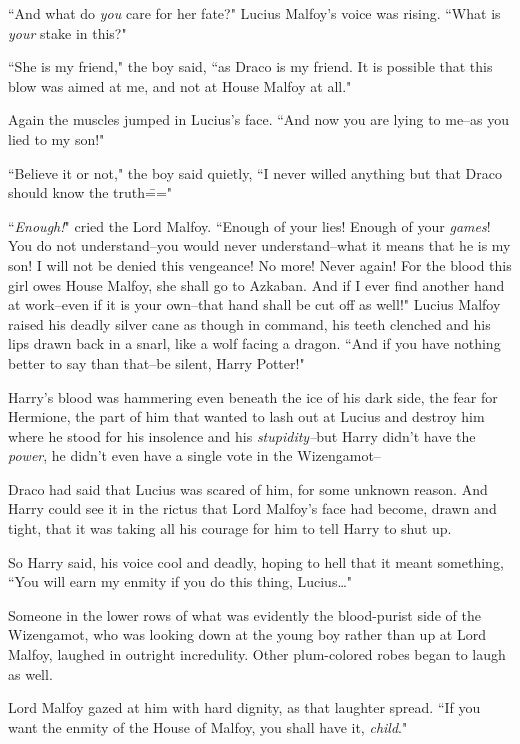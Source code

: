 ``And what do \emph{you} care for her fate?" Lucius Malfoy's voice was rising. ``What is \emph{your} stake in this?"

``She is my friend," the boy said, ``as Draco is my friend. It is possible that this blow was aimed at me, and not at House Malfoy at all."

Again the muscles jumped in Lucius's face. ``And now you are lying to me\---as you lied to my son!"

``Believe it or not," the boy said quietly, ``I never willed anything but that Draco should know the truth\==="

``\emph{Enough!}" cried the Lord Malfoy. ``Enough of your lies! Enough of your \emph{games}! You do not understand\---you would never understand\---what it means that he is my son! I will not be denied this vengeance! No more! Never again! For the blood this girl owes House Malfoy, she shall go to Azkaban. And if I ever find another hand at work\---even if it is your own\---that hand shall be cut off as well!" Lucius Malfoy raised his deadly silver cane as though in command, his teeth clenched and his lips drawn back in a snarl, like a wolf facing a dragon. ``And if you have nothing better to say than that\---be silent, Harry Potter!"

\later

Harry's blood was hammering even beneath the ice of his dark side, the fear for Hermione, the part of him that wanted to lash out at Lucius and destroy him where he stood for his insolence and his \emph{stupidity\---}but Harry didn't have the \emph{power}, he didn't even have a single vote in the Wizengamot\---

Draco had said that Lucius was scared of him, for some unknown reason. And Harry could see it in the rictus that Lord Malfoy's face had become, drawn and tight, that it was taking all his courage for him to tell Harry to shut up.

So Harry said, his voice cool and deadly, hoping to hell that it meant something, ``You will earn my enmity if you do this thing, Lucius{\ldots}"

Someone in the lower rows of what was evidently the blood-purist side of the Wizengamot, who was looking down at the young boy rather than up at Lord Malfoy, laughed in outright incredulity. Other plum-colored robes began to laugh as well.

Lord Malfoy gazed at him with hard dignity, as that laughter spread. ``If you want the enmity of the House of Malfoy, you shall have it, \emph{child}."

